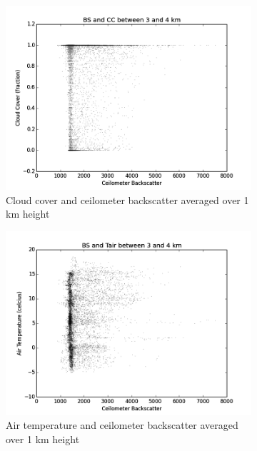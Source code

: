 \documentclass[a4paper,titlepage, twoside]{report}
\begin{document}
\begin{figure}
\centering
\begin{subfigure}{0.48\textwidth}
\includegraphics[width=\textwidth]{BS3_CC.png}
\caption{Cloud cover and ceilometer backscatter averaged over 1 km height}
\end{subfigure}
\hfill
\begin{subfigure}{0.48\textwidth}
\includegraphics[width=\textwidth]{BS3_Tair.png}
\caption{Air temperature and ceilometer backscatter averaged over 1 km height}
\end{subfigure}
\\
\begin{subfigure}{0.48\textwidth}

\end{subfigure}
\end{figure}
\end{document}

